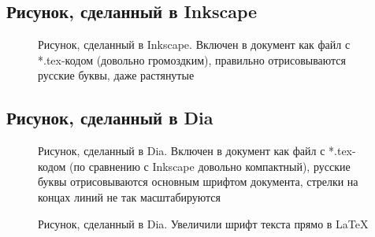 




\subsection{Рисунок, сделанный в Inkscape}

\begin{figure}[H] \centering

\caption{Рисунок, сделанный в Inkscape. Включен в документ как файл с *.tex-кодом (довольно громоздким), правильно отрисовываются русские буквы, даже растянутые}
\label{ris:image1_ink}
\end{figure}


\subsection{Рисунок, сделанный в Dia}

\begin{figure}[H] \centering

\caption{Рисунок, сделанный в Dia. Включен в документ как файл с *.tex-кодом (по сравнению с Inkscape довольно компактный), русские буквы отрисовываются основным шрифтом документа, стрелки на концах линий не так масштабируются}
\label{ris:image1_dia}
\end{figure}



\begin{figure}[H] \centering {}

\caption{Рисунок, сделанный в Dia. Увеличили шрифт текста прямо в LaTeX}
\label{ris:image1_dia}
\end{figure}






